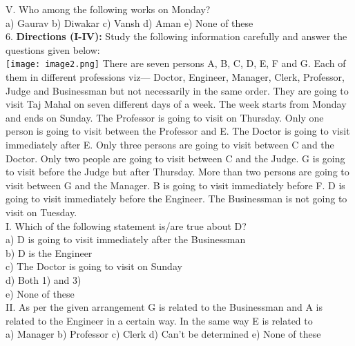 \documentclass[
]{article}
\begin{document}
V. Who among the following works on Monday?\\
a) Gaurav \hspace{2mm}b) Diwakar \hspace{2mm}c) Vansh \hspace{2mm}d) Aman \hspace{2mm}e) None of these\\

6. \textbf{Directions (I-IV):} Study the following information carefully and answer the questions given
below:\\
\texttt{[image: image2.png]}
There are seven persons A, B, C, D, E, F and G. Each of them in different professions viz—
Doctor, Engineer, Manager, Clerk, Professor, Judge and Businessman but not necessarily in
the same order. They are going to visit Taj Mahal on seven different days of a week. The
week starts from Monday and ends on Sunday. The Professor is going to visit on Thursday.
Only one person is going to visit between the Professor and E. The Doctor is going to visit
immediately after E. Only three persons are going to visit between C and the Doctor. Only
two people are going to visit between C and the Judge. G is going to visit before the Judge
but after Thursday. More than two persons are going to visit between G and the Manager. B
is going to visit immediately before F. D is going to visit immediately before the Engineer.
The Businessman is not going to visit on Tuesday.\\

I. Which of the following statement is/are true about D?\\
a) D is going to visit immediately after the Businessman\\
b) D is the Engineer\\
c) The Doctor is going to visit on Sunday\\
d) Both 1) and 3)\\
e) None of these\\

II. As per the given arrangement G is related to the Businessman and A is related to the
Engineer in a certain way. In the same way E is related to\\
a) Manager \hspace{2mm}b) Professor \hspace{2mm}c) Clerk
\hspace{2mm}d) Can’t be determined \hspace{2mm}e) None of these\\
\end{document}
